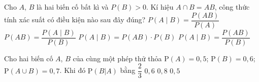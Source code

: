 \begin{ex}%
	Cho $A$, $B$ là hai biến cố bất kì và $P(B)>0$. Kí  hiệu $A\cap B=AB$, công thức tính xác suất có điều kiện nào sau đây đúng?
	\choice 
		 {$P(A\mid B)=\dfrac{P(A B)}{P(A)}$}
		{$P(AB)=\dfrac{P(A\mid B)}{P(B)}$} 
		{$P(A\mid B)=P(AB)\cdot P(B)$} 
		{\True  $P(A\mid B)=\dfrac{P(AB)}{P(B)}$}
\end{ex}

\begin{ex}%
	Cho hai biến cố $A$, $B$ của cùng một phép thử thỏa $\mathrm{P}(A) = 0{,}5$; $\mathrm{P}(B) = 0{,}6$; $\mathrm{P}(A \cup B) = 0{,}7$. Khi đó  $\mathrm{P}(B|A)$ bằng
	 \choice
		 {$\dfrac{2}{3}$}
		{$0{,}6$} 
		 {$0{,}8$}
		{\True $0{,}5$} 
\end{ex}



